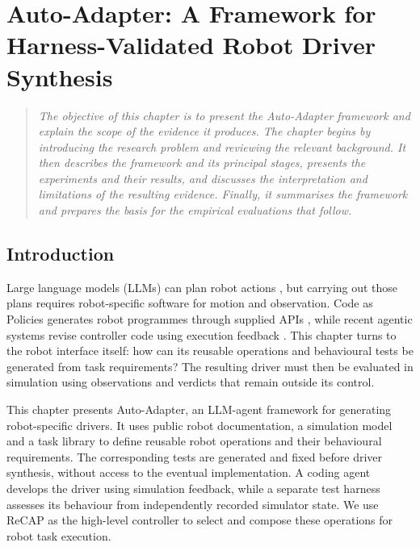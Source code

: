\chapter[Auto-Adapter Framework]{Auto-Adapter: A Framework for Harness-Validated Robot Driver Synthesis}
\label{chapter:autoadapter-component-analysis}

\begin{quote}\itshape
The objective of this chapter is to present the Auto-Adapter framework and
explain the scope of the evidence it produces. The chapter begins by
introducing the research problem and reviewing the relevant background. It then
describes the framework and its principal stages, presents the experiments and
their results, and discusses the interpretation and limitations of the
resulting evidence. Finally, it
summarises the framework and prepares the basis for the empirical evaluations
that follow.
\end{quote}

\section{Introduction}

Large language models (LLMs) can plan robot actions
\citep{ahn2022saycan,huang2023innermonologue}, but carrying out those plans
requires robot-specific software for motion and observation. Code as Policies
generates robot programmes through supplied APIs
\citep{liang2023codeaspolicies}, while recent agentic systems revise controller
code using execution feedback \citep{tripathi2026testdriven}. This chapter turns
to the robot interface itself: how can its reusable operations and behavioural
tests be generated from task requirements? The resulting driver must then be
evaluated in simulation using observations and verdicts that remain outside its
control.

This chapter presents Auto-Adapter, an LLM-agent framework for generating
robot-specific drivers. It uses public robot documentation, a simulation model
and a task library to define reusable robot operations and their behavioural
requirements. The corresponding tests are generated and fixed before driver
synthesis, without access to the eventual implementation. A coding agent
develops the driver using simulation feedback, while a separate test harness
assesses its behaviour from independently recorded simulator state. We use
ReCAP \citep{zhang2025recap} as the high-level controller to select and compose
these operations for robot task execution.

